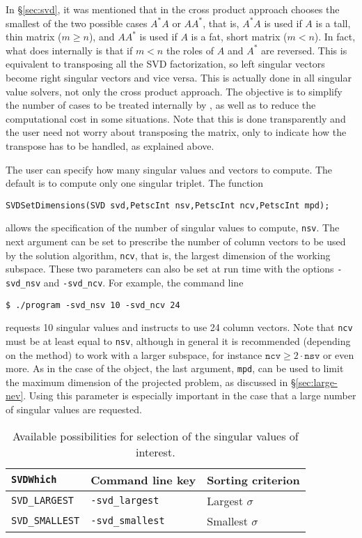 In \S\ref{sec:svd}, it was mentioned that in \slepc the cross product approach chooses the smallest of the two possible cases $A^*A$ or $AA^*$, that is, $A^*A$ is used if $A$ is a tall, thin matrix ($m\geq n$), and $AA^*$ is used if $A$ is a fat, short matrix ($m<n$). In fact, what \slepc does internally is that if $m<n$ the roles of $A$ and $A^*$ are reversed. This is equivalent to transposing all the SVD factorization, so left singular vectors become right singular vectors and vice versa. This is actually done in all singular value solvers, not only the cross product approach. The objective is to simplify the number of cases to be treated internally by \slepc, as well as to reduce the computational cost in some situations. Note that this is done transparently and the user need not worry about transposing the matrix, only to indicate how the transpose has to be handled, as explained above.

The user can specify how many singular values and vectors to compute. The default is to compute only one singular triplet. The function
        \begin{Verbatim}[fontsize=\small]
        SVDSetDimensions(SVD svd,PetscInt nsv,PetscInt ncv,PetscInt mpd);
        \end{Verbatim}
allows the specification of the number of singular values to compute, \texttt{nsv}. The next argument can be set to prescribe the number of column vectors to be used by the solution algorithm, \texttt{ncv}, that is, the largest dimension of the working subspace. These two parameters can also be set at run time with the options \Verb!-svd_nsv! and \Verb!-svd_ncv!. For example, the command line
\begin{Verbatim}[fontsize=\small]
        $ ./program -svd_nsv 10 -svd_ncv 24
\end{Verbatim}
requests 10 singular values and instructs to use 24 column vectors. Note that \texttt{ncv} must be at least equal to \texttt{nsv}, although in general it is recommended (depending on the method) to work with a larger subspace, for instance $\mathtt{ncv}\geq2\cdot\mathtt{nsv}$ or even more.
As in the case of the  object, the last argument, \texttt{mpd}, can be used to limit the maximum dimension of the projected problem, as discussed in \S\ref{sec:large-nev}. Using this parameter is especially important in the case that a large number of singular values are requested.

\begin{table}
\centering
{\small \begin{tabular}{lll}
\texttt{SVDWhich}                  & Command line key                   & Sorting criterion \\\hline
\texttt{SVD\_LARGEST}   & \texttt{-svd\_largest}  & Largest $\sigma$ \\
\texttt{SVD\_SMALLEST}  & \texttt{-svd\_smallest} & Smallest $\sigma$ \\\hline
\end{tabular} }
\caption{\label{tab:whichsvd}Available possibilities for selection of the singular values of interest.}
\end{table}

